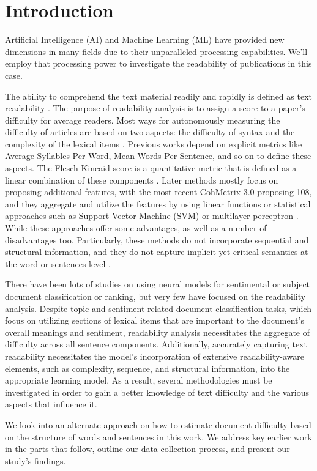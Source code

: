 \documentclass[conference]{IEEEtran}
\begin{document}
\section{Introduction}
Artificial Intelligence (AI) and Machine Learning (ML) have provided new dimensions in many fields due to their unparalleled processing capabilities. We'll employ that processing power to investigate the readability of publications in this case.
\par
The ability to comprehend the text material readily and rapidly is defined as text readability \cite{b1}. The purpose of readability analysis is to assign a score to a paper's difficulty for average readers. Most ways for autonomously measuring the difficulty of articles are based on two aspects: the difficulty of syntax and the complexity of the lexical items \cite{b2}. Previous works \cite{b3} \cite{b4} depend on explicit metrics like Average Syllables Per Word, Mean Words Per Sentence, and so on to define these aspects. The Flesch-Kincaid score is a quantitative metric that is defined as a linear combination of these components \cite{b5}. Later methods mostly focus on proposing additional features, with the most recent CohMetrix 3.0 \cite{b6} proposing 108, and they aggregate and utilize the features by using linear functions or statistical approaches such as Support Vector Machine (SVM) or multilayer perceptron \cite{b7}\cite{b8}\cite{b9}\cite{b10}\cite{b11}. While these approaches offer some advantages, as well as a number of disadvantages too. Particularly, these methods do not incorporate sequential and structural information, and they do not capture implicit yet critical semantics at the word or sentences level \cite{b2}.
\par
There have been lots of studies on using neural models for sentimental or subject document classification or ranking, but very few have focused on the readability analysis. Despite topic and sentiment-related document classification tasks, which focus on utilizing sections of lexical items that are important to the document's overall meanings and sentiment, readability analysis necessitates the aggregate of difficulty across all sentence components. Additionally, accurately capturing text readability necessitates the model's incorporation of extensive readability-aware elements, such as complexity, sequence, and structural information, into the appropriate learning model. As a result, several methodologies must be investigated in order to gain a better knowledge of text difficulty and the various aspects that influence it.
\par
We look into an alternate approach on how to estimate document difficulty based on the structure of words and sentences in this work. We address key earlier work in the parts that follow, outline our data collection process, and present our study's findings.
\end{document}
